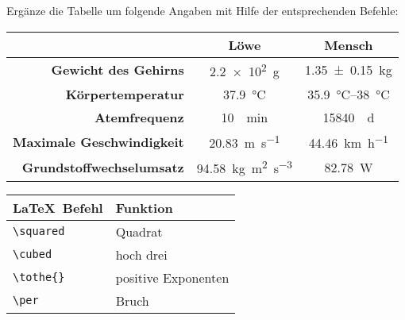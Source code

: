 \documentclass["WS\space 16-17\space -\space LaTeX-Kurs\space -\space Praesentation\space -\space 3.tex"]{subfiles}
\begin{document}
\begin{frame}[fragile]
	\begin{Aufgabe}
	Ergänze die Tabelle um folgende Angaben mit Hilfe der entsprechenden Befehle:
\end{Aufgabe}
	\begin{outputbox}
		\vspace{-0.1cm}
		\begin{center}
			\begin{tabular}{r|cc}
				\hline
				&	\textbf{Löwe}										& \textbf{Mensch} 						\\ \hline
				\textbf{Gewicht des Gehirns}		&	\SI{2.2e2}{\g}										& \SI{1.35 \pm 0.15}{\kg}				\\ 
				\textbf{Körpertemperatur}			&	\SI{37.9}{\degreeCelsius}							& \SIrange{35.9}{38}{\degreeCelsius}	\\
				\textbf{Atemfrequenz}				&	\SI{10}{\per \minute}								& \SI{15840}{\per\day} 					\\
				\textbf{Maximale Geschwindigkeit}	&	\SI{20.83}{\m\per\s}								& \SI{44.46}{\km\per\hour} 				\\ 
				\textbf{Grundstoffwechselumsatz}	&	\SI{94.58}{\kg\meter\squared\per\second\tothe{3}}	&  \SI{82.78}{\watt}\\
				\hline
			\end{tabular}
		\end{center}
		\vspace{-0.1cm}
	\end{outputbox}
	
	\begin{center}
		\begin{tabular}{ll}
	\toprule
	\LaTeX\ Befehl				& 	Funktion								\\ \midrule
	\lstinline|\squared|	&	Quadrat 				\\
	\lstinline|\cubed|				&	hoch drei				\\
	\lstinline/\tothe{}/			&	 positive Exponenten					\\
	\lstinline/\per/		&	Bruch			\\
	\bottomrule
\end{tabular}
	\end{center}
\end{frame}
\end{document}
